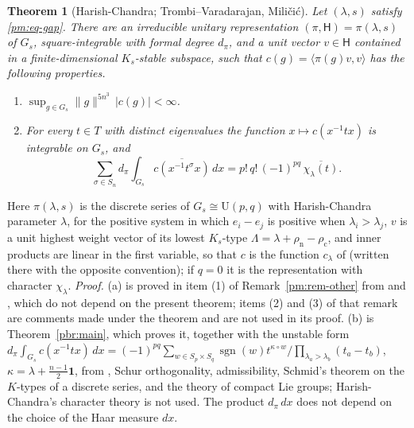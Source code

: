 \documentclass[10pt]{amsart}
\newtheorem{theorem}{Theorem}[section]
\theoremstyle{definition}
\theoremstyle{remark}
\providecommand{\auU}{\mathrm U}
\providecommand{\aubar}[1]{\overline{#1}}
\begin{document}
\begin{theorem}[Harish-Chandra; Trombi--Varadarajan, Mili\v{c}i\'c]\label{pm:arch}
Let $(\lambda,s)$ satisfy \eqref{pm:eq-gap}. There are an irreducible unitary representation
$(\pi,\mathsf H)=\pi(\lambda,s)$ of $G_s$, square-integrable with formal degree $d_\pi$, and a
unit vector $v\in\mathsf H$ contained in a finite-dimensional $K_s$-stable subspace, such that
$c(g)=\langle\pi(g)v,v\rangle$ has the following properties.
\begin{enumerate}
\item[(a)] $\sup_{g\in G_s}\|g\|^{5n^3}\,|c(g)|<\infty$.
\item[(b)] For every $t\in T$ with distinct eigenvalues the function $x\mapsto c(x^{-1}tx)$ is
integrable on $G_s$, and
\[
\sum_{\sigma\in S_n}d_\pi\int_{G_s}\aubar{c(x^{-1}t^\sigma x)}\,dx=p!\,q!\,(-1)^{pq}\,
\aubar{\chi_\lambda(t)} .
\]
\end{enumerate}
\end{theorem}
\noindent Here $\pi(\lambda,s)$ is the discrete series of $G_s\cong\auU(p,q)$ with Harish-Chandra
parameter $\lambda$, for the positive system in which $e_i-e_j$ is positive when
$\lambda_i>\lambda_j$, $v$ is a unit highest weight vector of its lowest $K_s$-type
$\Lambda=\lambda+\rho_{\mathrm n}-\rho_{\mathrm c}$, and inner products are linear in the first
variable, so that $c$ is the function $c_\lambda$ of {\cite[\S3.2]{P49}} (written there with the
opposite convention); if $q=0$ it is the representation with character $\chi_\lambda$.
\emph{Proof.} (a) is proved in item (1) of Remark~\ref{pm:rem-other} from {\cite[Theorem~3.17]{P49}} and {\cite[Lemma~3.25]{P49}}, which do not depend on the present theorem; items (2) and (3) of that remark are comments made under the theorem and are not used in its proof.
(b) is Theorem~\ref{pbr:main}, which proves it, together with the unstable form
$d_\pi\int_{G_s}c(x^{-1}tx)\,dx=(-1)^{pq}\sum_{w\in S_p\times S_q}\operatorname{sgn}(w)t^{\kappa\circ w}
/\prod_{\lambda_a>\lambda_b}(t_a-t_b)$, $\kappa=\lambda+\frac{n-1}2\mathbf 1$, from
{\cite[Theorem~3.17]{P49}}, Schur orthogonality, admissibility, Schmid's theorem on the $K$-types of a
discrete series, and the theory of compact Lie groups; Harish-Chandra's character theory is not used.
The product $d_\pi\,dx$ does not depend on the choice of the Haar measure $dx$.
\end{document}
